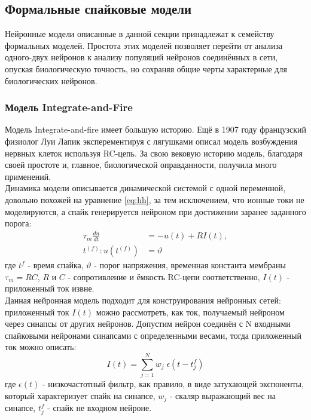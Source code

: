\documentclass[a4paper,10pt]{article}
\begin{document}
\subsection{Формальные спайковые модели}   
\indent Нейронные модели описанные в данной секции принадлежат к семейству формальных моделей. Простота этих моделей позволяет перейти от анализа одного-двух нейронов к анализу популяций нейронов соединённых в сети, опуская биологическую точность, но сохраняя общие черты характерные для биологических нейронов.\\
\subsubsection{Модель Integrate-and-Fire}

\indent Модель Integrate-and-fire имеет большую историю. Ещё в 1907 году 	французский физиолог Луи Лапик эксперементируя с лягушками описал модель возбуждения нервных клеток используя RC-цепь\cite{Lapicque}. За свою вековую историю модель, благодаря своей простоте и, главное, биологической оправданности, получила много применений.\\
   \indent Динамика модели описывается динамической системой с одной переменной, довольно похожей на уравнение \ref{eq:hh}, за тем исключением, что ионные токи не моделируются, а спайк генерируется нейроном при достижении заранее заданного порога:\\
   \begin{equation}\label{eq:iaf}
   \begin{split}
   \tau_{m}\frac{du}{dt}&=-u(t)+R I(t),\\
   t^{(f)}: u(t^{(f)}) &= \vartheta 
   \end{split}
   \end{equation}
где $t^{f}$ - время спайка, $\vartheta$ - порог напряжения, временная константа мембраны $\tau_{m}=RC$, $R$ и $C$ - сопротивление и ёмкость RC-цепи соответственно, $I(t)$ - приложенный ток извне.\\   
\indent Данная нейронная модель подходит для конструирования нейронных сетей: приложенный ток $I(t)$ можно рассмотреть, как ток, получаемый нейроном через синапсы от других нейронов. Допустим нейрон соединён с N входными спайковыми нейронами синапсами с определенными весами, тогда приложенный ток можно описать:
\begin{equation}\label{eq:iaf_syn}
I(t) = \sum_{j=1}^{N} w_{j}\; \epsilon(t-t_{j}^{f})
\end{equation}
где $\epsilon(t)$ - низкочастотный фильтр, как правило, в виде затухающей экспоненты, который характеризует спайк на синапсе, $w_{j}$ - скаляр выражающий вес на синапсе, $t_{j}^{f}$ - спайк не входном нейроне.\\
\end{document}
